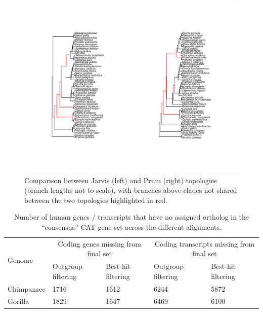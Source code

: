 \documentclass{article}
\begin{document}
\begin{figure}
\begin{center}
\includegraphics[width=\textwidth]{jarvis_prum_compare}
\caption{Comparison between Jarvis (left) and Prum (right) topologies (branch lengths not to scale), with branches above clades not shared between the two topologies highlighted in red.}\label{fig:jarvisPrumCompare}
\end{center}
\end{figure}

\begin{table}
\begin{center}
\begin{tabular}{lllll}
\toprule
\multirow{2}{*}{Genome} & \multicolumn{2}{c}{Coding genes missing from final set} & \multicolumn{2}{c}{Coding transcripts missing from final set} \\
\cmidrule{2-3} \cmidrule{4-5}
& Outgroup filtering & Best-hit filtering & Outgroup filtering & Best-hit filtering \\
\midrule
Chimpanzee & 1716 & 1612 & 6244 & 5872 \\
Gorilla & 1829 & 1647 & 6469 & 6100 \\
\bottomrule
\end{tabular}
\caption[Genes / transcripts missing in the ``consensus'' CAT gene set in the paralogy-filtering comparison]{Number of human genes / transcripts that have no assigned ortholog in the ``consensus'' CAT gene set across the different alignments.}\label{tab:mapqCat}
\end{center}
\end{table}
\end{document}
